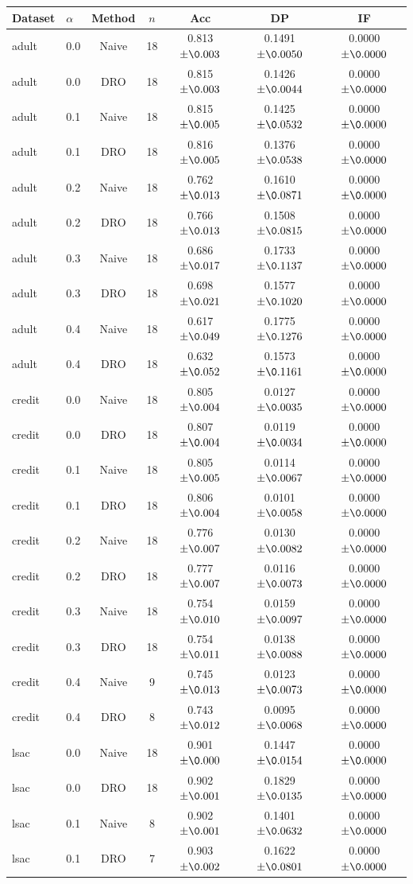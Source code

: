 \begin{tabular}{llccccc}
\toprule
Dataset & $\alpha$ & Method & $n$ & Acc & DP & IF \\
\midrule
adult & 0.0 & Naive & 18 & 0.813$\pm\0.003$ & 0.1491$\pm\0.0050$ & 0.0000$\pm\0.0000$ \\
adult & 0.0 & DRO & 18 & 0.815$\pm\0.003$ & 0.1426$\pm\0.0044$ & 0.0000$\pm\0.0000$ \\
adult & 0.1 & Naive & 18 & 0.815$\pm\0.005$ & 0.1425$\pm\0.0532$ & 0.0000$\pm\0.0000$ \\
adult & 0.1 & DRO & 18 & 0.816$\pm\0.005$ & 0.1376$\pm\0.0538$ & 0.0000$\pm\0.0000$ \\
adult & 0.2 & Naive & 18 & 0.762$\pm\0.013$ & 0.1610$\pm\0.0871$ & 0.0000$\pm\0.0000$ \\
adult & 0.2 & DRO & 18 & 0.766$\pm\0.013$ & 0.1508$\pm\0.0815$ & 0.0000$\pm\0.0000$ \\
adult & 0.3 & Naive & 18 & 0.686$\pm\0.017$ & 0.1733$\pm\0.1137$ & 0.0000$\pm\0.0000$ \\
adult & 0.3 & DRO & 18 & 0.698$\pm\0.021$ & 0.1577$\pm\0.1020$ & 0.0000$\pm\0.0000$ \\
adult & 0.4 & Naive & 18 & 0.617$\pm\0.049$ & 0.1775$\pm\0.1276$ & 0.0000$\pm\0.0000$ \\
adult & 0.4 & DRO & 18 & 0.632$\pm\0.052$ & 0.1573$\pm\0.1161$ & 0.0000$\pm\0.0000$ \\
\midrule
credit & 0.0 & Naive & 18 & 0.805$\pm\0.004$ & 0.0127$\pm\0.0035$ & 0.0000$\pm\0.0000$ \\
credit & 0.0 & DRO & 18 & 0.807$\pm\0.004$ & 0.0119$\pm\0.0034$ & 0.0000$\pm\0.0000$ \\
credit & 0.1 & Naive & 18 & 0.805$\pm\0.005$ & 0.0114$\pm\0.0067$ & 0.0000$\pm\0.0000$ \\
credit & 0.1 & DRO & 18 & 0.806$\pm\0.004$ & 0.0101$\pm\0.0058$ & 0.0000$\pm\0.0000$ \\
credit & 0.2 & Naive & 18 & 0.776$\pm\0.007$ & 0.0130$\pm\0.0082$ & 0.0000$\pm\0.0000$ \\
credit & 0.2 & DRO & 18 & 0.777$\pm\0.007$ & 0.0116$\pm\0.0073$ & 0.0000$\pm\0.0000$ \\
credit & 0.3 & Naive & 18 & 0.754$\pm\0.010$ & 0.0159$\pm\0.0097$ & 0.0000$\pm\0.0000$ \\
credit & 0.3 & DRO & 18 & 0.754$\pm\0.011$ & 0.0138$\pm\0.0088$ & 0.0000$\pm\0.0000$ \\
credit & 0.4 & Naive & 9 & 0.745$\pm\0.013$ & 0.0123$\pm\0.0073$ & 0.0000$\pm\0.0000$ \\
credit & 0.4 & DRO & 8 & 0.743$\pm\0.012$ & 0.0095$\pm\0.0068$ & 0.0000$\pm\0.0000$ \\
\midrule
lsac & 0.0 & Naive & 18 & 0.901$\pm\0.000$ & 0.1447$\pm\0.0154$ & 0.0000$\pm\0.0000$ \\
lsac & 0.0 & DRO & 18 & 0.902$\pm\0.001$ & 0.1829$\pm\0.0135$ & 0.0000$\pm\0.0000$ \\
lsac & 0.1 & Naive & 8 & 0.902$\pm\0.001$ & 0.1401$\pm\0.0632$ & 0.0000$\pm\0.0000$ \\
lsac & 0.1 & DRO & 7 & 0.903$\pm\0.002$ & 0.1622$\pm\0.0801$ & 0.0000$\pm\0.0000$ \\
\bottomrule
\end{tabular}
